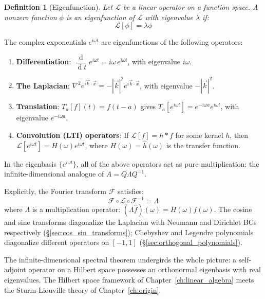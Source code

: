 \documentclass[12pt,a4paper]{report}
\DeclareMathOperator{\deriv}{d}
\theoremstyle{thms}
\theoremstyle{defns}
\newtheorem{definition}{Definition}[section]
\begin{document}
\begin{definition}[Eigenfunction]
    Let $\mathcal{L}$ be a linear operator on a function space. A nonzero function $\phi$ is an eigenfunction of $\mathcal{L}$ with eigenvalue $\lambda$ if:
    \begin{equation}
        \mathcal{L}[\phi] = \lambda\phi
    \end{equation}
\end{definition}

The complex exponentials $e^{i\omega t}$ are eigenfunctions of the following operators:

\begin{enumerate}
    \item \textbf{Differentiation}: $\dfrac{\deriv}{\deriv t}e^{i\omega t} = i\omega\, e^{i\omega t}$, with eigenvalue $i\omega$.

    \item \textbf{The Laplacian}: $\nabla^2 e^{i\vec{k}\cdot\vec{x}} = -|\vec{k}|^2 e^{i\vec{k}\cdot\vec{x}}$, with eigenvalue $-|\vec{k}|^2$.

    \item \textbf{Translation}: $T_a[f](t) = f(t - a)$ gives $T_a[e^{i\omega t}] = e^{-i\omega a}e^{i\omega t}$, with eigenvalue $e^{-i\omega a}$.

    \item \textbf{Convolution (LTI) operators}: If $\mathcal{L}[f] = h * f$ for some kernel $h$, then $\mathcal{L}[e^{i\omega t}] = H(\omega)e^{i\omega t}$, where $H(\omega) = \hat{h}(\omega)$ is the transfer function.
\end{enumerate}

\noindent In the eigenbasis $\{e^{i\omega t}\}$, all of the above operators act as pure multiplication: the infinite-dimensional analogue of $A = Q\Lambda Q^{-1}$.

Explicitly, the Fourier transform $\mathcal{F}$ satisfies:
\begin{equation}
    \mathcal{F} \circ \mathcal{L} \circ \mathcal{F}^{-1} = \Lambda
\end{equation}
where $\Lambda$ is a multiplication operator: $(\Lambda \hat{f})(\omega) = H(\omega)\hat{f}(\omega)$. The cosine and sine transforms diagonalize the Laplacian with Neumann and Dirichlet BCs respectively (\S\ref{sec:cos_sin_transforms}); Chebyshev and Legendre polynomials diagonalize different operators on $[-1, 1]$ (\S\ref{sec:orthogonal_polynomials}).

The infinite-dimensional spectral theorem undergirds the whole picture: a self-adjoint operator on a Hilbert space possesses an orthonormal eigenbasis with real eigenvalues. The Hilbert space framework of Chapter~\ref{ch:linear_algebra} meets the Sturm-Liouville theory of Chapter~\ref{ch:origin}.
\end{document}
